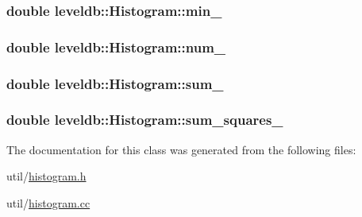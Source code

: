 \subsubsection[{min\+\_\+}]{\setlength{\rightskip}{0pt plus 5cm}double leveldb\+::\+Histogram\+::min\+\_\+\hspace{0.3cm}{\ttfamily [private]}}\label{classleveldb_1_1_histogram_aa074ae70ad7abbdaf12b97282eb1b700}
\hypertarget{classleveldb_1_1_histogram_a3ec0c6cddbe0b040ee05d938f716e9b2}{}
\subsubsection[{num\+\_\+}]{\setlength{\rightskip}{0pt plus 5cm}double leveldb\+::\+Histogram\+::num\+\_\+\hspace{0.3cm}{\ttfamily [private]}}\label{classleveldb_1_1_histogram_a3ec0c6cddbe0b040ee05d938f716e9b2}
\hypertarget{classleveldb_1_1_histogram_a5a2588e02237189eca8a1b2e8601e961}{}
\subsubsection[{sum\+\_\+}]{\setlength{\rightskip}{0pt plus 5cm}double leveldb\+::\+Histogram\+::sum\+\_\+\hspace{0.3cm}{\ttfamily [private]}}\label{classleveldb_1_1_histogram_a5a2588e02237189eca8a1b2e8601e961}
\hypertarget{classleveldb_1_1_histogram_a10c67c4ce34a29c17d000927f730632e}{}
\subsubsection[{sum\+\_\+squares\+\_\+}]{\setlength{\rightskip}{0pt plus 5cm}double leveldb\+::\+Histogram\+::sum\+\_\+squares\+\_\+\hspace{0.3cm}{\ttfamily [private]}}\label{classleveldb_1_1_histogram_a10c67c4ce34a29c17d000927f730632e}


The documentation for this class was generated from the following files\+:\begin{DoxyCompactItemize}
\item 
util/\hyperlink{histogram_8h}{histogram.\+h}\item 
util/\hyperlink{histogram_8cc}{histogram.\+cc}\end{DoxyCompactItemize}
